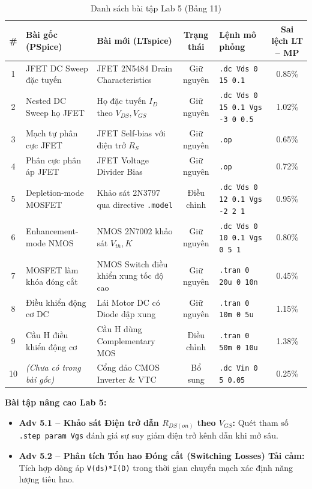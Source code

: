 \documentclass[12pt,a4paper]{report}
\begin{document}
\begin{table}[H]
\centering
\caption{Danh sách bài tập Lab 5 (Bảng 11)}
\label{tab:bang11_lab5}
\renewcommand{\arraystretch}{1.2}
\small
\begin{tabularx}{\textwidth}{|c|p{4.0cm}|p{4.0cm}|c|l|c|}
\hline
\rowcolor{codebg}
\textbf{\#} & \textbf{Bài gốc (PSpice)} & \textbf{Bài mới (LTspice)} & \textbf{Trạng thái} & \textbf{Lệnh mô phỏng} & \textbf{Sai lệch LT -- MP} \\ \hline
1 & JFET DC Sweep đặc tuyến & JFET 2N5484 Drain Characteristics & Giữ nguyên & \lstinline|.dc Vds 0 15 0.1| & 0.85\% \\ \hline
2 & Nested DC Sweep họ JFET & Họ đặc tuyến $I_D$ theo $V_{DS}, V_{GS}$ & Giữ nguyên & \lstinline|.dc Vds 0 15 0.1 Vgs -3 0 0.5| & 1.02\% \\ \hline
3 & Mạch tự phân cực JFET & JFET Self-bias với điện trở $R_S$ & Giữ nguyên & \lstinline|.op| & 0.65\% \\ \hline
4 & Phân cực phân áp JFET & JFET Voltage Divider Bias & Giữ nguyên & \lstinline|.op| & 0.72\% \\ \hline
5 & Depletion-mode MOSFET & Khảo sát 2N3797 qua directive \lstinline|.model| & Điều chỉnh & \lstinline|.dc Vds 0 12 0.1 Vgs -2 2 1| & 0.95\% \\ \hline
6 & Enhancement-mode NMOS & NMOS 2N7002 khảo sát $V_{th}, K$ & Giữ nguyên & \lstinline|.dc Vds 0 10 0.1 Vgs 0 5 1| & 0.80\% \\ \hline
7 & MOSFET làm khóa đóng cắt & NMOS Switch điều khiển xung tốc độ cao & Giữ nguyên & \lstinline|.tran 0 20u 0 10n| & 0.45\% \\ \hline
8 & Điều khiển động cơ DC & Lái Motor DC có Diode dập xung & Giữ nguyên & \lstinline|.tran 0 10m 0 5u| & 1.15\% \\ \hline
9 & Cầu H điều khiển động cơ & Cầu H dùng Complementary MOS & Điều chỉnh & \lstinline|.tran 0 50m 0 10u| & 1.38\% \\ \hline
10 & \textit{(Chưa có trong bài gốc)} & Cổng đảo CMOS Inverter \& VTC & Bổ sung & \lstinline|.dc Vin 0 5 0.05| & 0.25\% \\ \hline
\end{tabularx}
\end{table}

\textbf{Bài tập nâng cao Lab 5:}
\begin{itemize}[noitemsep]
    \item \textbf{Adv 5.1 -- Khảo sát Điện trở dẫn $R_{DS(on)}$ theo $V_{GS}$:} Quét tham số \lstinline|.step param Vgs| đánh giá sự suy giảm điện trở kênh dẫn khi mở sâu.
    \item \textbf{Adv 5.2 -- Phân tích Tổn hao Đóng cắt (Switching Losses) Tải cảm:} Tích hợp dòng áp \lstinline|V(ds)*I(D)| trong thời gian chuyển mạch xác định năng lượng tiêu hao.
\end{itemize}
\end{document}
